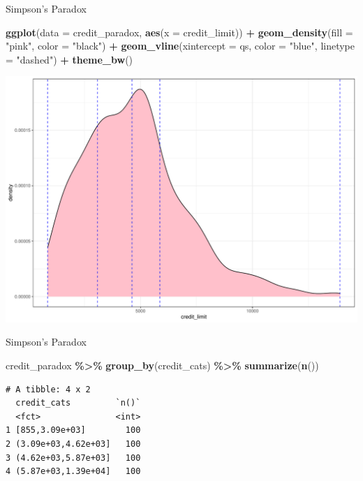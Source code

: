 \documentclass[
  ignorenonframetext,
]{beamer}
\newenvironment{Shaded}{\begin{snugshade}}{\end{snugshade}}
\newcommand{\AttributeTok}[1]{\textcolor[rgb]{0.13,0.29,0.53}{#1}}
\newcommand{\FunctionTok}[1]{\textcolor[rgb]{0.13,0.29,0.53}{\textbf{#1}}}
\newcommand{\NormalTok}[1]{#1}
\newcommand{\SpecialCharTok}[1]{\textcolor[rgb]{0.81,0.36,0.00}{\textbf{#1}}}
\newcommand{\StringTok}[1]{\textcolor[rgb]{0.31,0.60,0.02}{#1}}
\begin{document}
\begin{frame}[fragile]{Simpson's Paradox}
\protect\hypertarget{simpsons-paradox-3}{}
\small

\begin{Shaded}
\begin{Highlighting}[]
\FunctionTok{ggplot}\NormalTok{(}\AttributeTok{data =}\NormalTok{ credit\_paradox, }\FunctionTok{aes}\NormalTok{(}\AttributeTok{x =}\NormalTok{ credit\_limit)) }\SpecialCharTok{+}
  \FunctionTok{geom\_density}\NormalTok{(}\AttributeTok{fill =} \StringTok{"pink"}\NormalTok{, }\AttributeTok{color =} \StringTok{"black"}\NormalTok{) }\SpecialCharTok{+} 
  \FunctionTok{geom\_vline}\NormalTok{(}\AttributeTok{xintercept =}\NormalTok{ qs, }\AttributeTok{color =} \StringTok{"blue"}\NormalTok{, }
             \AttributeTok{linetype =} \StringTok{"dashed"}\NormalTok{) }\SpecialCharTok{+} 
  \FunctionTok{theme\_bw}\NormalTok{()}
\end{Highlighting}
\end{Shaded}

\begin{center}\includegraphics[width=0.8\linewidth,height=0.5\textheight]{Week5_Lect_files/figure-beamer/unnamed-chunk-51-1} \end{center}
\normalsize
\end{frame}

\begin{frame}[fragile]{Simpson's Paradox}
\protect\hypertarget{simpsons-paradox-4}{}
\normalsize

\begin{Shaded}
\begin{Highlighting}[]
\NormalTok{credit\_paradox }\SpecialCharTok{\%\textgreater{}\%} 
  \FunctionTok{group\_by}\NormalTok{(credit\_cats) }\SpecialCharTok{\%\textgreater{}\%} 
  \FunctionTok{summarize}\NormalTok{(}\FunctionTok{n}\NormalTok{())}
\end{Highlighting}
\end{Shaded}

\begin{verbatim}
# A tibble: 4 x 2
  credit_cats         `n()`
  <fct>               <int>
1 [855,3.09e+03]        100
2 (3.09e+03,4.62e+03]   100
3 (4.62e+03,5.87e+03]   100
4 (5.87e+03,1.39e+04]   100
\end{verbatim}

\normalsize
\end{frame}
\end{document}
